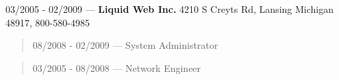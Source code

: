 03/2005 - 02/2009 --- {\bf Liquid Web Inc.} 4210 S Creyts Rd, Lansing Michigan 48917, 800-580-4985
\begin{quote}
08/2008 - 02/2009 --- System Administrator\\
\end{quote}
\begin{quote}
03/2005 - 08/2008 --- Network Engineer\\
\end{quote}
